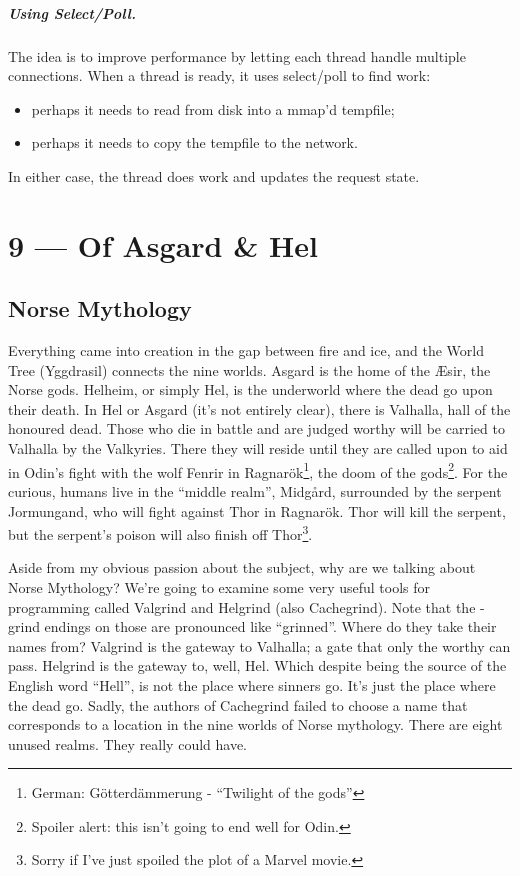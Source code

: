 \documentclass[a4paper]{report}
\begin{document}
\paragraph{Using Select/Poll.} The idea is to improve performance
by letting each thread handle multiple connections.
When a thread is ready, it uses select/poll to find work:
    \begin{itemize}
      \item perhaps it needs to read from disk into a mmap'd tempfile;
      \item perhaps it needs to copy the tempfile to the network.
    \end{itemize}

In either case, the thread does work and updates the request state.









\chapter*{9 --- Of Asgard \& Hel}


\section*{Norse Mythology}
Everything came into creation in the gap between fire and ice, and the World Tree (Yggdrasil) connects the nine worlds. Asgard is the home of the \AE sir, the Norse gods. Helheim, or simply Hel, is the underworld where the dead go upon their death. In Hel or Asgard (it's not entirely clear), there is Valhalla, hall of the honoured dead. Those who die in battle and are judged worthy will be carried to Valhalla by the Valkyries. There they will reside until they are called upon to aid in Odin's fight with the wolf Fenrir in Ragnar\"ok\footnote{German: G\"otterd\"ammerung - ``Twilight of the gods''}, the doom of the gods\footnote{Spoiler alert: this isn't going to end well for Odin.}. For the curious, humans live in the ``middle realm'', Midg\aa rd, surrounded by the serpent Jormungand, who will fight against Thor in  Ragnar\"ok. Thor will kill the serpent, but the serpent's poison will also finish off Thor\footnote{Sorry if I've just spoiled the plot of a Marvel movie.}.

Aside from my obvious passion about the subject, why are we talking about Norse Mythology? We're going to examine some very useful tools for programming called Valgrind and Helgrind (also Cachegrind). Note that the -grind endings on those are pronounced like ``grinned''. Where do they take their names from? Valgrind is the gateway to Valhalla; a gate that only the worthy can pass. Helgrind is the gateway to, well, Hel. Which despite being the source of the English word ``Hell'', is not the place where sinners go. It's just the place where the dead go. Sadly, the authors of Cachegrind failed to choose a name that corresponds to a location in the nine worlds of Norse mythology. There are eight unused realms. They really could have.
\end{document}
